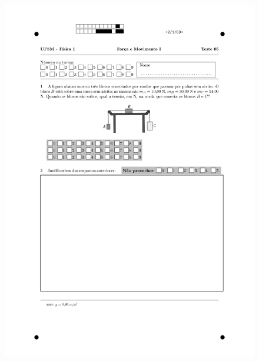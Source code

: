 \begin{figure}[H]\centering
\includegraphics[scale=0.7]{fig/orp1q4_page-0002.jpg}
\end{figure}
\vspace*{\fill}
